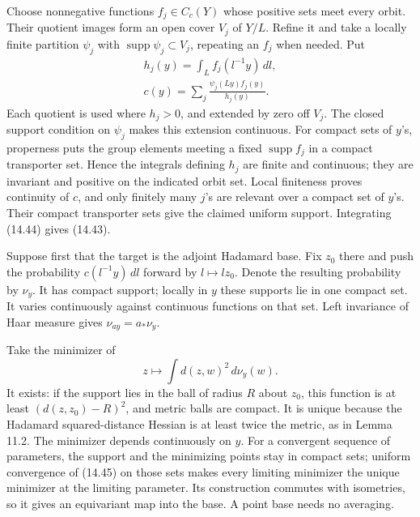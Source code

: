 \documentclass[
  11pt,
]{article}
\begin{document}
Choose nonnegative functions \(f_j\in C_c(Y)\) whose positive sets meet
every orbit. Their quotient images form an open cover \(V_j\) of
\(Y/L\). Refine it and take a locally finite partition \(\psi_j\) with
\(\operatorname{supp}\psi_j\subset V_j\), repeating an \(f_j\) when
needed. Put \[
\begin{gathered}
h_j(y)=\int_L f_j(l^{-1}y)\,dl,\\
c(y)=\sum_j
 \frac{\psi_j(Ly)f_j(y)}{h_j(y)}.
\end{gathered}
\tag{14.44}
\] Each quotient is used where \(h_j>0\), and extended by zero off
\(V_j\). The closed support condition on \(\psi_j\) makes this extension
continuous. For compact sets of \(y\)'s, properness puts the group
elements meeting a fixed \(\operatorname{supp}f_j\) in a compact
transporter set. Hence the integrals defining \(h_j\) are finite and
continuous; they are invariant and positive on the indicated orbit set.
Local finiteness proves continuity of \(c\), and only finitely many
\(j\)'s are relevant over a compact set of \(y\)'s. Their compact
transporter sets give the claimed uniform support. Integrating (14.44)
gives (14.43).

Suppose first that the target is the adjoint Hadamard base. Fix \(z_0\)
there and push the probability \(c(l^{-1}y)\,dl\) forward by
\(l\mapsto lz_0\). Denote the resulting probability by \(\nu_y\). It has
compact support; locally in \(y\) these supports lie in one compact set.
It varies continuously against continuous functions on that set. Left
invariance of Haar measure gives \(\nu_{ay}=a_*\nu_y\).

Take the minimizer of \[
z\longmapsto\int d(z,w)^2\,d\nu_y(w).
\tag{14.45}
\] It exists: if the support lies in the ball of radius \(R\) about
\(z_0\), this function is at least \((d(z,z_0)-R)^2\), and metric balls
are compact. It is unique because the Hadamard squared-distance Hessian
is at least twice the metric, as in Lemma 11.2. The minimizer depends
continuously on \(y\). For a convergent sequence of parameters, the
support and the minimizing points stay in compact sets; uniform
convergence of (14.45) on those sets makes every limiting minimizer the
unique minimizer at the limiting parameter. Its construction commutes
with isometries, so it gives an equivariant map into the base. A point
base needs no averaging.
\end{document}
